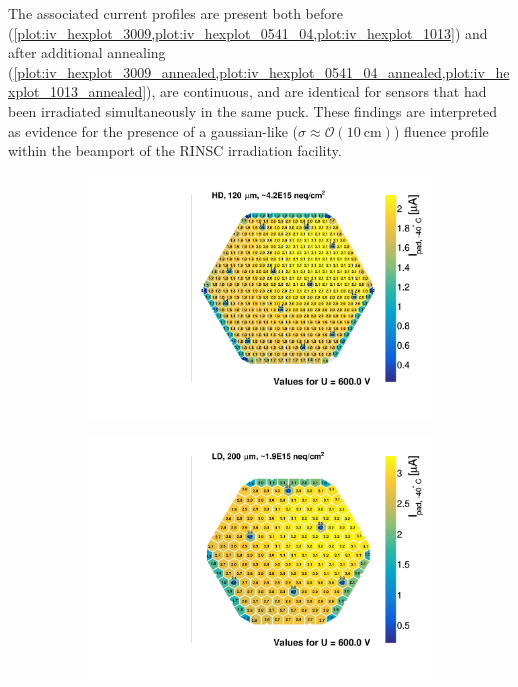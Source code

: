 The associated current profiles are present both before (\ref{plot:iv_hexplot_3009,plot:iv_hexplot_0541_04,plot:iv_hexplot_1013}) and after additional annealing (\ref{plot:iv_hexplot_3009_annealed,plot:iv_hexplot_0541_04_annealed,plot:iv_hexplot_1013_annealed}), are continuous, and are identical for sensors that had been irradiated simultaneously in the same puck.
These findings are interpreted as evidence for the presence of a gaussian-like ($\sigma\approx\mathcal{O}(\SI{10}{\centi\metre})$) fluence profile within the beamport of the RINSC irradiation facility.
\begin{figure}
	\captionsetup[subfigure]{aboveskip=-1pt,belowskip=-1pt}
	\centering
	\begin{subfigure}[b]{0.32\textwidth}
		\includegraphics[width=0.999\textwidth]{plots/iv_hexplots/3009.pdf}
		\subcaption{
		}
		\label{plot:iv_hexplot_3009}
	\end{subfigure}
	\hfill
	\begin{subfigure}[b]{0.32\textwidth}
		\includegraphics[width=0.999\textwidth]{plots/iv_hexplots/0541_04.pdf}

\end{subfigure}
\end{figure}
